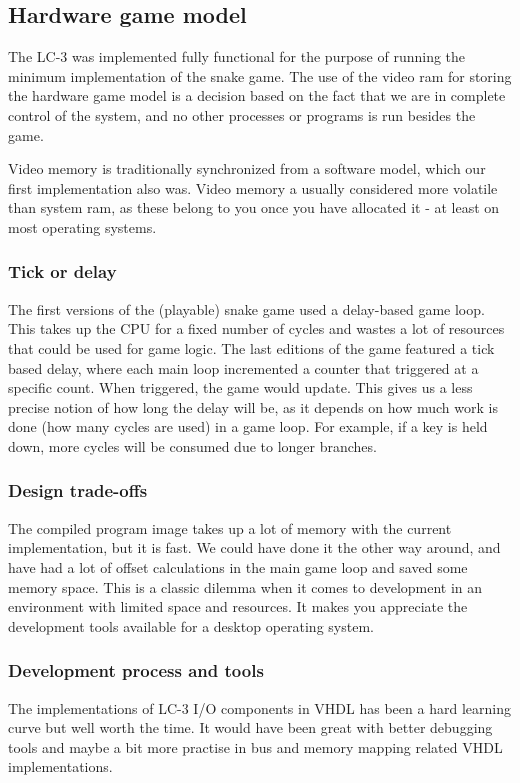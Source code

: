 \documentclass{acm_proc_article-sp}
\begin{document}
\subsection{Hardware game model}
The LC-3 was implemented fully functional for the purpose of running the minimum implementation of the snake game.
The use of the video ram for storing the hardware game model is a decision based on the fact that we are in complete control of the system, and no other processes or programs is run besides the game.

Video memory is traditionally synchronized from a software model, which our first implementation also was. Video memory a usually considered more volatile than system ram, as these belong to you once you have allocated it - at least on most operating systems.

\subsubsection{Tick or delay}
The first versions of the (playable) snake game used a delay-based game loop. This takes up the CPU for a fixed number of cycles and wastes a lot of resources that could be used for game logic.
The last editions of the game featured a tick based delay, where each main loop incremented a counter that triggered at a specific count. When triggered, the game would update. This gives us a less precise notion of how long the delay will be, as it depends on how much work is done (how many cycles are used) in a game loop. For example, if a key is held down, more cycles will be consumed due to longer branches.

\subsubsection{Design trade-offs}
The compiled program image takes up a lot of memory with the current implementation, but it is fast. We could have done it the other way around, and have had a lot of offset calculations in the main game loop and saved some memory space. This is a classic dilemma when it comes to development in an environment with limited space and resources. It makes you appreciate the development tools available for a desktop operating system.

\subsubsection{Development process and tools}
The implementations of LC-3 I/O components in VHDL has been a hard learning curve but well worth the time.
It would have been great with better debugging tools and maybe a bit more practise in bus and memory mapping related VHDL implementations.
\end{document}
